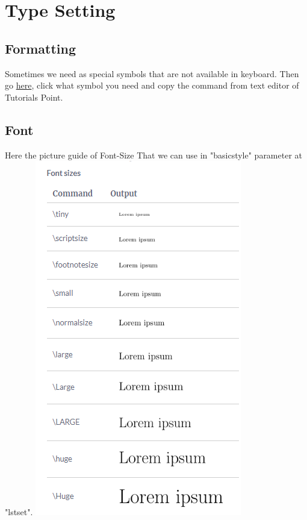 \documentclass[10 pt]{book}
\begin{document}
\chapter{Type Setting}
\section{Formatting}
Sometimes we need as special symbols that are not available in keyboard. Then go \href{https://www.tutorialspoint.com/online_latex_editor.php}{{\color{blue}here}}, click what symbol you need and copy the command from text editor of {\color{red}Tutorials Point}.

\section{Font}
Here the picture guide of Font-Size That we can use in "basicstyle" parameter at "lstset".
\includegraphics[scale=1]{../Font size.png} 
\end{document}
